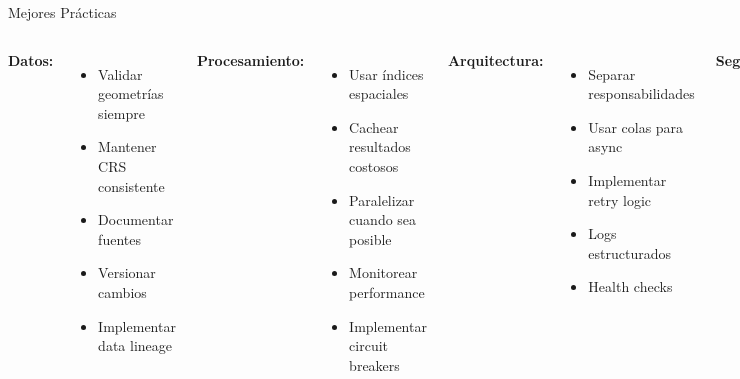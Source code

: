 \documentclass[10pt,aspectratio=169]{beamer}
\begin{document}
\begin{frame}{Mejores Prácticas}
    \begin{columns}[T]
        \textbf{\faCheckCircle\space Datos:}
        \begin{itemize}
            \item Validar geometrías siempre
            \item Mantener CRS consistente
            \item Documentar fuentes
            \item Versionar cambios
            \item Implementar data lineage
        \end{itemize}
        
        \vspace{0.3cm}
        \textbf{\faCheckCircle\space Procesamiento:}
        \begin{itemize}
            \item Usar índices espaciales
            \item Cachear resultados costosos
            \item Paralelizar cuando sea posible
            \item Monitorear performance
            \item Implementar circuit breakers
        \end{itemize}
        
        \textbf{\faCheckCircle\space Arquitectura:}
        \begin{itemize}
            \item Separar responsabilidades
            \item Usar colas para async
            \item Implementar retry logic
            \item Logs estructurados
            \item Health checks
        \end{itemize}
        
        \vspace{0.3cm}
        \textbf{\faCheckCircle\space Seguridad:}
        \begin{itemize}
            \item Sanitizar inputs espaciales
            \item Rate limiting en APIs
            \item Encriptar datos sensibles
            \item Auditar accesos
            \item Backup regular
        \end{itemize}
    \end{columns}
\end{frame}
\end{document}
